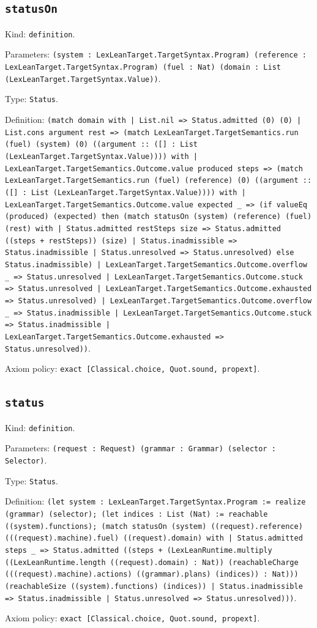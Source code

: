 \documentclass[11pt]{article}
\begin{document}
\subsection*{\texttt{statusOn}}
\noindent Kind: \texttt{definition}.\par
\noindent Parameters: \texttt{(system : LexLeanTarget.TargetSyntax.Program) (reference : LexLeanTarget.TargetSyntax.Program) (fuel : Nat) (domain : List (LexLeanTarget.TargetSyntax.Value))}.\par
\noindent Type: \texttt{Status}.\par
\noindent Definition: \texttt{(match domain with | List.nil => Status.admitted (0) (0) | List.cons argument rest => (match LexLeanTarget.TargetSemantics.run (fuel) (system) (0) ((argument :: ([] : List (LexLeanTarget.TargetSyntax.Value)))) with | LexLeanTarget.TargetSemantics.Outcome.value produced steps => (match LexLeanTarget.TargetSemantics.run (fuel) (reference) (0) ((argument :: ([] : List (LexLeanTarget.TargetSyntax.Value)))) with | LexLeanTarget.TargetSemantics.Outcome.value expected \_ => (if valueEq (produced) (expected) then (match statusOn (system) (reference) (fuel) (rest) with | Status.admitted restSteps size => Status.admitted ((steps + restSteps)) (size) | Status.inadmissible => Status.inadmissible | Status.unresolved => Status.unresolved) else Status.inadmissible) | LexLeanTarget.TargetSemantics.Outcome.overflow \_ => Status.unresolved | LexLeanTarget.TargetSemantics.Outcome.stuck => Status.unresolved | LexLeanTarget.TargetSemantics.Outcome.exhausted => Status.unresolved) | LexLeanTarget.TargetSemantics.Outcome.overflow \_ => Status.inadmissible | LexLeanTarget.TargetSemantics.Outcome.stuck => Status.inadmissible | LexLeanTarget.TargetSemantics.Outcome.exhausted => Status.unresolved))}.\par
\noindent Axiom policy: \texttt{exact [Classical.choice, Quot.sound, propext]}.\par
\subsection*{\texttt{status}}
\noindent Kind: \texttt{definition}.\par
\noindent Parameters: \texttt{(request : Request) (grammar : Grammar) (selector : Selector)}.\par
\noindent Type: \texttt{Status}.\par
\noindent Definition: \texttt{(let system : LexLeanTarget.TargetSyntax.Program := realize (grammar) (selector); (let indices : List (Nat) := reachable ((system).functions); (match statusOn (system) ((request).reference) (((request).machine).fuel) ((request).domain) with | Status.admitted steps \_ => Status.admitted ((steps + (LexLeanRuntime.multiply ((LexLeanRuntime.length ((request).domain) : Nat)) (reachableCharge (((request).machine).actions) ((grammar).plans) (indices)) : Nat))) (reachableSize ((system).functions) (indices)) | Status.inadmissible => Status.inadmissible | Status.unresolved => Status.unresolved)))}.\par
\noindent Axiom policy: \texttt{exact [Classical.choice, Quot.sound, propext]}.\par
\end{document}
